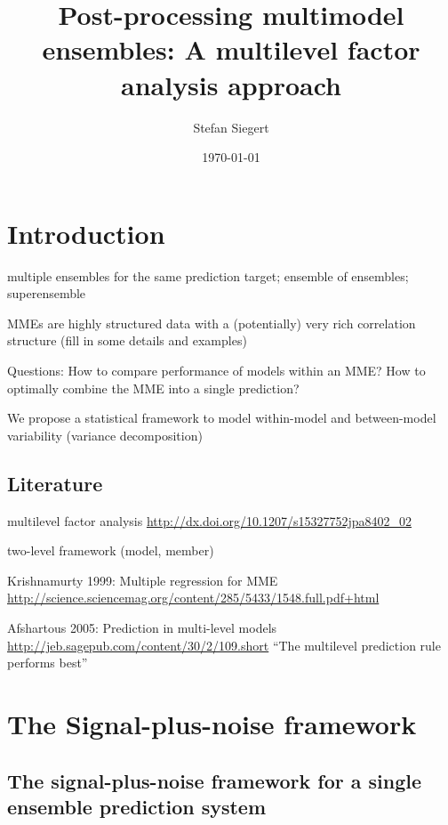 \documentclass[12pt]{article}
\author{Stefan Siegert}
\title{Post-processing multimodel ensembles: A multilevel factor analysis approach}
\date{\today}
\begin{document}
\maketitle
\thispagestyle{empty}

\tableofcontents

\section{Introduction}

multiple ensembles for the same prediction target; ensemble of ensembles; superensemble

MMEs are highly structured data with a (potentially) very rich correlation structure (fill in some details and examples)

Questions:
How to compare performance of models within an MME?
How to optimally combine the MME into a single prediction?

We propose a statistical framework to model within-model and between-model variability (variance decomposition)



\subsection{Literature}

multilevel factor analysis \url{http://dx.doi.org/10.1207/s15327752jpa8402_02}

two-level framework (model, member)

Krishnamurty 1999: Multiple regression for MME \url{http://science.sciencemag.org/content/285/5433/1548.full.pdf+html}

Afshartous 2005: Prediction in multi-level models \url{http://jeb.sagepub.com/content/30/2/109.short} ``The multilevel prediction rule performs best''






\section{The Signal-plus-noise framework}

\subsection{The signal-plus-noise framework for a single ensemble prediction system}
\end{document}

